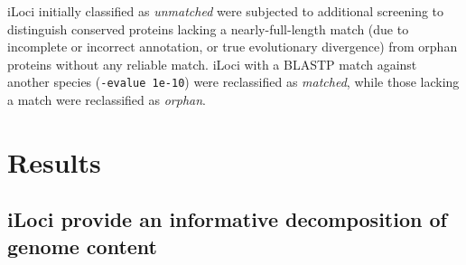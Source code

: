 iLoci initially classified as \textit{unmatched} were subjected to additional screening to distinguish conserved proteins lacking a nearly-full-length match (due to incomplete or incorrect annotation, or true evolutionary divergence) from orphan proteins without any reliable match.
iLoci with a BLASTP match against another species (\texttt{-evalue 1e-10}) were reclassified as \textit{matched}, while those lacking a match were reclassified as \textit{orphan}.










\section{Results}

\subsection{iLoci provide an informative decomposition of genome content}

